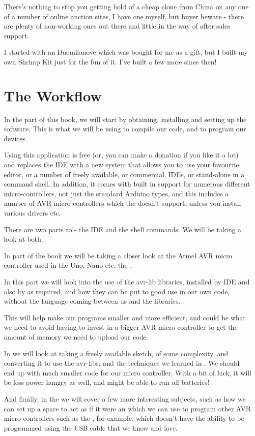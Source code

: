 There's nothing to stop you getting hold of a cheap  clone from China on any one of a number of online auction sites, I have one myself, but buyer beware - there are plenty of non-working ones out there and little in the way of after sales support.

I started with an  Duemilanove which was bought for me as a gift, but I built my own Shrimp Kit just for the fun of it. I've built a few more since then!

\section*{The Workflow}\label{the-workflow}  

In the  part of this book, we will start by obtaining, installing and setting up the  software. This is what we will be using to compile our code, and to program our devices. 

Using this application is free (or, you can make a donation if you like it a lot) and replaces the  IDE with a new system that allows you to use your favourite editor, or a number of freely available, or commercial, IDEs, or stand-alone in a command shell. In addition, it comes with built in support for numerous different micro-controllers, not just the standard Arduino types, and this includes a number of AVR micro-controllers which the  doesn't support, unless you install various drivers etc.

There are two parts to  - the IDE and the shell commands. We will be taking a look at both.

In  part of the book we will be taking a closer look at the Atmel AVR micro controller used in the Uno, Nano etc, the . 

In this part we will look into the use of the avr-lib libraries, installed by  IDE and also by  as required, and how they can be put to good use in our own code, without the  language coming between us and the libraries.

This will help make our programs smaller and more efficient, and could be what we need to avoid having to invest in a bigger AVR micro controller to get the amount of memory we need to upload our code.

In  we will look at taking a freely available  sketch, of some complexity, and converting it to use the avr-libs, and the techniques we learned in . We should end up with much smaller code for our micro controller. With a bit of luck, it will be less power hungry as well, and might be able to run off batteries!

And finally, in the  we will cover a few more interesting subjects, such as how we can set up a spare  to act as if it were an  which we can use to program other AVR micro controllers such as the , for example, which doesn't have the ability to be programmed using the USB cable that we know and love.

